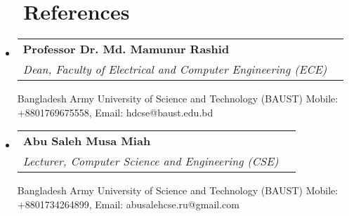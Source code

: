 \documentclass[a4paper,20pt]{article}
\makeatletter
\newcommand{\resumeSubheading}[4]{
  \vspace{-1pt}\item
    \begin{tabular*}{0.97\textwidth}{l@{\extracolsep{\fill}}r}
      \textbf{#1} & #2 \\
      \textit{#3} & \textit{#4} \\
    \end{tabular*}\vspace{-5pt}
}
\newcommand{\resumeSubHeadingListStart}{\begin{itemize}[leftmargin=*]}
\newcommand{\resumeSubHeadingListEnd}{\end{itemize}}
\makeatother
\begin{document}
\vspace{5pt}

\section{~~References}
  \resumeSubHeadingListStart
    \resumeSubheading
      {Professor Dr. Md. Mamunur Rashid}{} 
      {Dean, Faculty of Electrical and Computer Engineering (ECE)}{} 
      \hfill \break
      {Bangladesh Army University of Science and Technology (BAUST)
      \newline
      Mobile: +8801769675558, Email: hdcse@baust.edu.bd \DontPrintColon}
  \resumeSubHeadingListEnd
  
  \resumeSubHeadingListStart
    \resumeSubheading
      {Abu Saleh Musa Miah}{} 
      {Lecturer, Computer Science and Engineering (CSE)}{} 
      \hfill \break
      {Bangladesh Army University of Science and Technology (BAUST)
      \newline
      Mobile: +8801734264899, Email: abusalehcse.ru@gmail.com \DontPrintColon}
  \resumeSubHeadingListEnd
\end{document}
